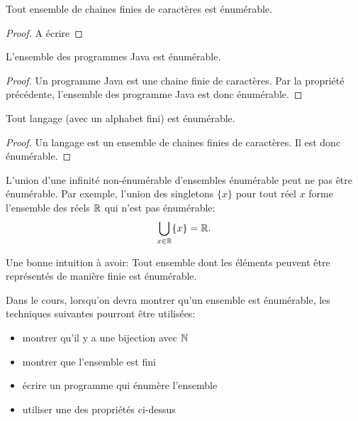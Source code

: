 \begin{myprop}
 Tout ensemble  de chaines finies de caractères est énumérable.
 \begin{proof}
	A écrire
 \end{proof}
\end{myprop}

\begin{myprop}
 L'ensemble des programmes Java est énumérable.
 \begin{proof}
  Un programme Java est une chaine finie de caractères.  Par la propriété précédente, l'ensemble des programme Java est  donc énumérable.
 \end{proof}
\end{myprop}


\begin{myprop}
 Tout langage (avec un alphabet fini) est énumérable. 
 \begin{proof}
 Un langage est un ensemble de chaines finies de caractères.  Il est donc  énumérable.
 \end{proof}
\end{myprop}

L'union d'une infinité non-énumérable d'ensembles énumérable peut ne pas être énumérable.
Par exemple, l'union des singletons $\{x\}$ pour tout réel $x$ forme l'ensemble des réels $\mathbb{R}$ qui n'est pas énumérable:
\[ \bigcup_{x \in \mathbb{R}} \{x\} = \mathbb{R}. \]

\begin{myrem}
  Une bonne intuition à avoir:
  Tout ensemble dont les éléments peuvent être représentés de manière finie est énumérable.
\end{myrem}

Dans le cours, lorsqu'on devra montrer qu'un ensemble est énumérable,
les techniques suivantes pourront être utilisées:
\begin{itemize}
	\item montrer qu'il y a une bijection avec $\mathbb{N}$ 
	\item montrer que l'ensemble est fini
	\item écrire un programme qui énumère l'ensemble
	\item utiliser une des propriétés ci-dessus
\end{itemize}


